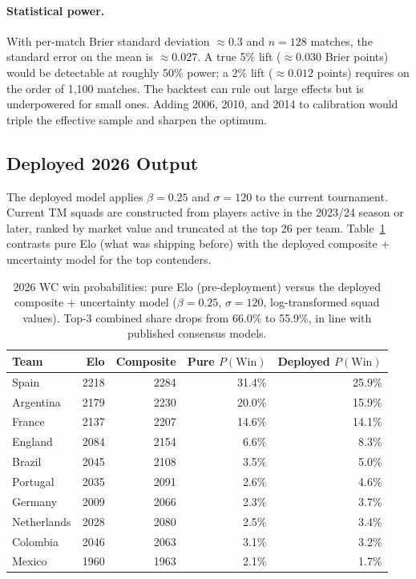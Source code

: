 \documentclass[11pt]{article}
\begin{document}
\paragraph{Statistical power.} With per-match Brier standard deviation $\approx 0.3$ and $n = 128$ matches, the standard error on the mean is $\approx 0.027$. A true 5\% lift ($\approx 0.030$ Brier points) would be detectable at roughly 50\% power; a 2\% lift ($\approx 0.012$ points) requires on the order of 1{,}100 matches. The backtest can rule out large effects but is underpowered for small ones. Adding 2006, 2010, and 2014 to calibration would triple the effective sample and sharpen the optimum.

\subsection{Deployed 2026 Output}

The deployed model applies $\beta = 0.25$ and $\sigma = 120$ to the current tournament. Current TM squads are constructed from players active in the 2023/24 season or later, ranked by market value and truncated at the top 26 per team. Table~\ref{tab:composite2026} contrasts pure Elo (what was shipping before) with the deployed composite + uncertainty model for the top contenders.

\begin{table}[h]
\centering
\begin{tabular}{@{}lrrrr@{}}
\toprule
Team & Elo & Composite & Pure $P(\text{Win})$ & Deployed $P(\text{Win})$ \\
\midrule
Spain     & 2218 & 2284 & 31.4\% & 25.9\% \\
Argentina & 2179 & 2230 & 20.0\% & 15.9\% \\
France    & 2137 & 2207 & 14.6\% & 14.1\% \\
England   & 2084 & 2154 & 6.6\%  & 8.3\%  \\
Brazil    & 2045 & 2108 & 3.5\%  & 5.0\%  \\
Portugal  & 2035 & 2091 & 2.6\%  & 4.6\%  \\
Germany   & 2009 & 2066 & 2.3\%  & 3.7\%  \\
Netherlands & 2028 & 2080 & 2.5\% & 3.4\% \\
Colombia  & 2046 & 2063 & 3.1\%  & 3.2\%  \\
Mexico    & 1960 & 1963 & 2.1\%  & 1.7\%  \\
\bottomrule
\end{tabular}
\caption{2026 WC win probabilities: pure Elo (pre-deployment) versus the deployed composite + uncertainty model ($\beta = 0.25$, $\sigma = 120$, log-transformed squad values). Top-3 combined share drops from 66.0\% to 55.9\%, in line with published consensus models.}
\label{tab:composite2026}
\end{table}
\end{document}
